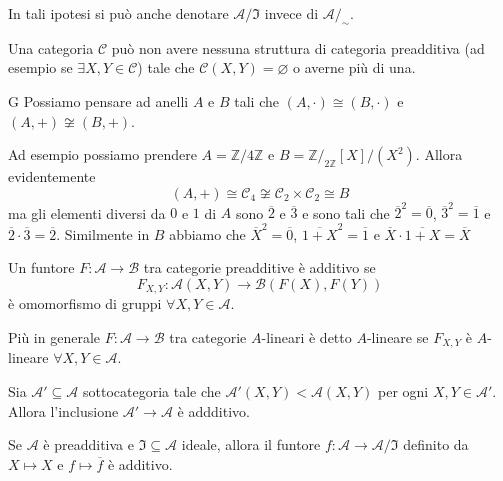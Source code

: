 In tali ipotesi si può anche denotare \(\mathcal{A} / \mathfrak{I}\) invece di
\(\mathcal{A}/_\sim\).

Una categoria \(\mathcal{\mathcal{C}}\) può non avere nessuna struttura di categoria
    preadditiva (ad esempio se \(\exists X, Y \in \mathcal{\mathcal{C}}\)) tale che \(\mathcal{\mathcal{C}}{(X, Y)} = \varnothing\) o averne più di una.

\begin{example}{G}
    Possiamo pensare ad anelli \(A\) e \(B\) tali che \({(A, \cdot )} \cong {(B, \cdot )}\) e \({(A, +)} \not\cong {(B, +)}\).

    Ad esempio possiamo prendere \(A = \mathbb{Z} / 4 \mathbb{Z}\) e \(B = \mathbb{Z} /_{2 \mathbb{Z}} [X] / {(X^2)}\). Allora evidentemente 
    \[
      {(A, +)} \cong \mathcal{C}_4 \not\cong \mathcal{C}_{2} \times \mathcal{C}_{2} \cong B
    \]
    ma gli elementi diversi da \(0\) e \(1\) di \(A\) sono \(\overline{2}\) e \(\overline{3}\) e sono tali che \(\overline{2}^2 = \overline{0}\), \(\overline{3}^2 = \overline{1}\) e \(\overline{2} \cdot \overline{3} = \overline{2}\). Similmente in \(B\) abbiamo che
    \(
      \overline{X}^2 = \overline{0}
    \), \(\overline{1+X}^2 = \overline{1}\) e \(\overline{X} \cdot \overline{1+X} = \overline{X}\)
\end{example}

\begin{definition}{}
    Un funtore \(F : \mathcal{A} \to \mathcal{B}\) tra categorie preadditive è
    additivo se 
    \[
      F_{X,Y}  : \mathcal{A}{(X, Y)} \to \mathcal{B}{(F{(X)}, F{(Y)})}
    \]
    è omomorfismo di gruppi \(\forall X, Y \in \mathcal{A}\).

    Più in generale \(F: \mathcal{A} \to \mathcal{B}\) tra categorie
    \(A\)-lineari è detto \(A\)-lineare se \(F_{X, Y} \) è \(A\)-lineare \(\forall X, Y \in \mathcal{A}\).
\end{definition}

\begin{example}{}
    Sia \(\mathcal{A}' \subseteq \mathcal{A} \) sottocategoria tale che \(\mathcal{A}'{(X, Y)} < \mathcal{A}{(X,Y)}\) per ogni \(X,Y \in \mathcal{A}'\). Allora l'inclusione \(\mathcal{A}' \to \mathcal{A}\) è addditivo.
\end{example}

\begin{example}{}
    Se \(\mathcal{A}\) è preadditiva e \(\mathfrak{I} \subseteq \mathcal{A} \)
    ideale, allora il funtore \(f : \mathcal{A} \to \mathcal{A}/\mathfrak{I}\) 
    definito da \(X \mapsto X\) e \(f \mapsto \overline{f}\) è additivo.
\end{example}

